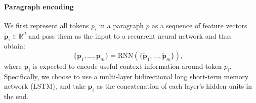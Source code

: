 \documentclass[11pt,a4paper]{article}
\begin{document}
\paragraph{\textbf{Paragraph encoding}} We first represent all tokens $p_i$ in a paragraph $p$
as a sequence of feature vectors $\tilde{\mathbf{p}}_i \in \mathbb{R}^d$ and pass them as the input to a recurrent neural network and thus obtain:
\begin{equation*}
    \{\mathbf{p}_1, \ldots, \mathbf{p}_m\} = \text{RNN}(\{\tilde{\mathbf{p}}_1, \ldots, \tilde{\mathbf{p}}_m \}),
\end{equation*}
where $\mathbf{p}_i$ is expected to encode useful context information around token $p_i$. Specifically, we choose to use a multi-layer bidirectional long short-term memory network (LSTM), and take $\mathbf{p}_i$ as the concatenation of each layer's hidden units in the end.
\end{document}
